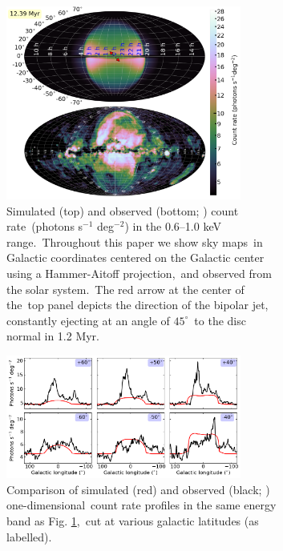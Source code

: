 \documentclass[fleqn,usenatbib,useAMS]{mnras}
\begin{document}
 \begin{figure}%
      \begin{subfigure}[t]{\textwidth}%
         \centering%
         \includegraphics[width=0.85\textwidth]{figures/fig__xraymap.png}%
         \caption{
               Simulated (top) and observed (bottom; \citealt{Predehl2020}) count rate\
               (photons s$^{-1}$ deg$^{-2}$) in the 0.6--1.0 keV range.\
               Throughout this paper we show sky maps\
               in Galactic coordinates centered on the Galactic center using a Hammer-Aitoff projection,\
               and observed from the solar system.\
               The red arrow at the center of the\
               top panel depicts the direction of the bipolar jet, constantly ejecting at an angle of $45^{\circ}$\
               to the disc normal in 1.2 Myr.
         }%
         \label{fig__xray_0.8keV_angle_000}%
         \end{subfigure}%
         \hspace{4pt}%
      \begin{subfigure}[t]{\textwidth}%
         \centering%
         \includegraphics[width=0.85\textwidth]{figures/fig__xray-profile-0.8keV-000.png}%
         \caption{
               Comparison of simulated (red) and observed (black; \citealt{Predehl2020}) one-dimensional\
               count rate profiles in the same energy band as Fig. \ref{fig__xray_0.8keV_angle_000},\
               cut at various galactic latitudes (as labelled).
         }%
         \label{fig__x-ray-profile-0.8keV-000}%
      \end{subfigure}%
      \caption{}%
      \label{fig_xray-map}
 \end{figure}%
\end{document}
